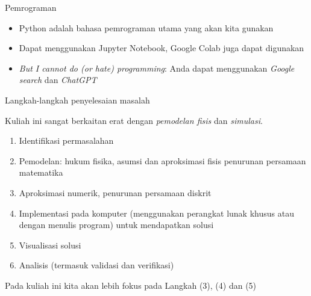 \begin{frame}{Pemrograman}

\begin{itemize}
\item Python adalah bahasa pemrograman utama yang akan kita gunakan
\item Dapat menggunakan Jupyter Notebook, Google Colab juga dapat digunakan
\item \textit{But I cannot do (or hate) programming}:
Anda dapat menggunakan \textit{Google search} dan \textit{ChatGPT}
\end{itemize}

\end{frame}



\begin{frame}{Langkah-langkah penyelesaian masalah}

Kuliah ini sangat berkaitan erat dengan \textit{pemodelan fisis}
dan \textit{simulasi}.

\begin{enumerate}[(1)]
\item Identifikasi permasalahan
\item Pemodelan: hukum fisika, asumsi dan aproksimasi fisis penurunan
  persamaan matematika
\item Aproksimasi numerik, penurunan persamaan diskrit
\item Implementasi pada komputer (menggunakan perangkat lunak khusus atau
  dengan menulis program) untuk mendapatkan solusi
\item Visualisasi solusi
\item Analisis (termasuk validasi dan verifikasi)
\end{enumerate}

Pada kuliah ini kita akan lebih fokus pada Langkah (3), (4) dan (5)
\end{frame}




